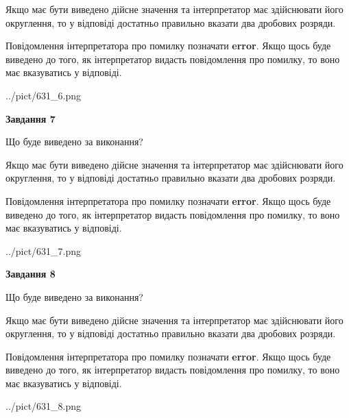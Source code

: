 \documentclass[12pt, ukrainian]{article}
\begin{document}
{\begin {Large}
Якщо має бути виведено дійсне значення та інтерпретатор має здійснювати його округлення, 
то у відповіді достатньо правильно вказати два дробових розряди.

Повідомлення інтерпретатора про помилку позначати \textbf{error}.
Якщо щось буде виведено до того, як інтерпретатор видасть повідомлення про помилку, 
то воно має вказуватись у відповіді. \par

\begin{center}
	{../pict/631_6.png}
\end{center}
\newpage

{\begin {center}\textbf{Завдання 7}\end {center}}\par
Що буде виведено за виконання? \par

Якщо має бути виведено дійсне значення та інтерпретатор має здійснювати його округлення, 
то у відповіді достатньо правильно вказати два дробових розряди.

Повідомлення інтерпретатора про помилку позначати \textbf{error}.
Якщо щось буде виведено до того, як інтерпретатор видасть повідомлення про помилку, 
то воно має вказуватись у відповіді. \par

\begin{center}
	{../pict/631_7.png}
\end{center}
\newpage

{\begin {center}\textbf{Завдання 8}\end {center}}\par
Що буде виведено за виконання? \par

Якщо має бути виведено дійсне значення та інтерпретатор має здійснювати його округлення, 
то у відповіді достатньо правильно вказати два дробових розряди.

Повідомлення інтерпретатора про помилку позначати \textbf{error}.
Якщо щось буде виведено до того, як інтерпретатор видасть повідомлення про помилку, 
то воно має вказуватись у відповіді. \par

\begin{center}
	{../pict/631_8.png}
\end{center}
\newpage


\end{Large}}
\end{document}
